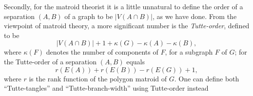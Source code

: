 Secondly, for the matroid theorist it is a little unnatural to define the order of a separation $(A, B)$ of a graph to be $|V(A \cap B)|$, as we have done. From the viewpoint of matroid theory, a more significant number is the \textit{Tutte-order}, defined to be
\begin{equation*}
|V(A \cap B)| + 1 + \kappa(G) - \kappa(A) - \kappa(B),
\end{equation*}
where $\kappa(F)$ denotes the number of components of $F$, for a subgraph $F$ of $G$; for the Tutte-order of a separation $(A, B)$ equals
\begin{equation*}
r(E(A)) + r(E(B)) - r(E(G)) + 1,
\end{equation*}
where $r$ is the rank function of the polygon matroid of $G$. One can define both ``Tutte-tangles'' and ``Tutte-branch-width'' using Tutte-order instead
